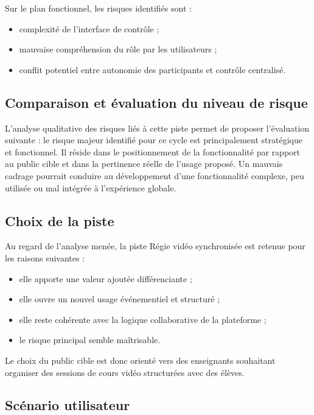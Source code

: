 \documentclass[12pt,a4paper]{report}
\begin{document}
Sur le plan fonctionnel, les risques identifiés sont :
\begin{itemize}
  \item complexité de l’interface de contrôle ;
  \item mauvaise compréhension du rôle par les utilisateurs ;
  \item conflit potentiel entre autonomie des participants et contrôle centralisé.
\end{itemize}

\subsection{Comparaison et évaluation du niveau de risque}

L’analyse qualitative des risques liés à cette piste permet de proposer l’évaluation suivante :
le risque majeur identifié pour ce cycle est principalement stratégique et fonctionnel.
Il réside dans le positionnement de la fonctionnalité par rapport au public cible et dans la
pertinence réelle de l’usage proposé. Un mauvais cadrage pourrait conduire au développement
d’une fonctionnalité complexe, peu utilisée ou mal intégrée à l’expérience globale.

\subsection{Choix de la piste}

Au regard de l’analyse menée, la piste Régie vidéo synchronisée est retenue pour les raisons
suivantes :
\begin{itemize}
  \item elle apporte une valeur ajoutée différenciante ;
  \item elle ouvre un nouvel usage événementiel et structuré ;
  \item elle reste cohérente avec la logique collaborative de la plateforme ;
  \item le risque principal semble maîtrisable.
\end{itemize}
Le choix du public cible est donc orienté vers des enseignants souhaitant organiser des sessions
de cours vidéo structurées avec des élèves.

\subsection{Scénario utilisateur}
\end{document}
